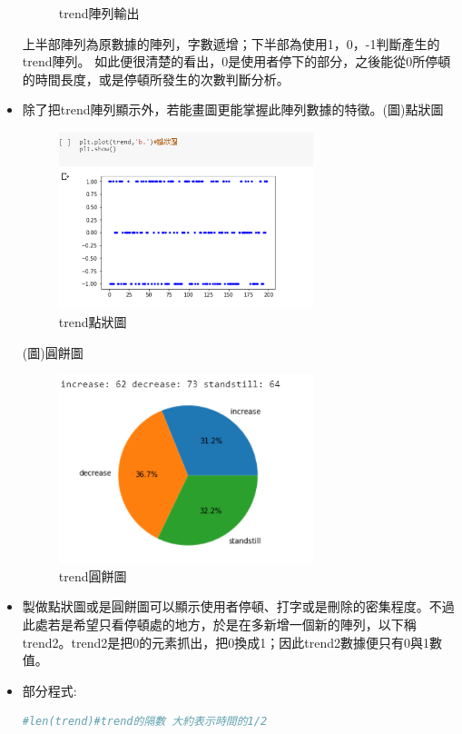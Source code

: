 \begin{itemize}
\begin{figure}[H]
		\caption{trend陣列輸出} 
		\label{Fig.3.12} 
	\end{figure}
	上半部陣列為原數據的陣列，字數遞增；下半部為使用1，0，-1判斷產生的trend陣列。
	如此便很清楚的看出，0是使用者停下的部分，之後能從0所停頓的時間長度，或是停頓所發生的次數判斷分析。
	\item 除了把trend陣列顯示外，若能畫圖更能掌握此陣列數據的特徵。(圖)點狀圖
	\begin{figure}[H] 
		\centering 
		\includegraphics[width=0.7\textwidth]{3_12.png} 
		\caption{trend點狀圖} 
		\label{Fig.3.13} 
	\end{figure}
	(圖)圓餅圖
	\begin{figure}[H] 
		\centering 
		\includegraphics[width=0.7\textwidth]{3_13.png} 
		\caption{trend圓餅圖} 
		\label{Fig.3.14} 
	\end{figure}
\item 製做點狀圖或是圓餅圖可以顯示使用者停頓、打字或是刪除的密集程度。不過此處若是希望只看停頓處的地方，於是在多新增一個新的陣列，以下稱trend2。trend2是把0的元素抓出，把0換成1；因此trend2數據便只有0與1數值。
\item 部分程式:
\begin{lstlisting}[language=Python,caption=python數據trend2]
#len(trend)#trend的隔數 大約表示時間的1/2

\end{lstlisting}
\end{itemize}
